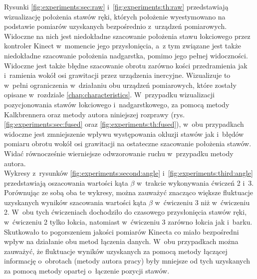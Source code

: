 Rysunki \ref{fig:experiments:sec:raw} i~\ref{fig:experiments:th:raw} przedstawiają wizualizację położenia stawów ręki, których położenie wyestymowano na podstawie pomiarów uzyskanych bezpośrednio z~urządzeń pomiarowych. Widoczne na nich jest niedokładne szacowanie położenia stawu łokciowego przez kontroler Kinect w~momencie jego przysłonięcia, a~z tym związane jest także niedokładne szacowanie położenia nadgarstka, pomimo jego pełnej widoczności. Widoczne jest także błędne szacowanie obrotu zarówno kości przedramienia jak i~ramienia wokół osi grawitacji przez urządzenia inercyjne. Wizualizuje to w~pełni ograniczenia w~działaniu obu urządzeń pomiarowych, które zostały opisane w~rozdziale \ref{chap:characteristics}. W~przypadku wizualizacji pozycjonowania stawów łokciowego i~nadgarstkowego, za pomocą metody Kalkbrennera oraz metody autora niniejszej rozprawy (rys. \ref{fig:experiments:sec:fused} oraz \ref{fig:experiments:th:fused}), w~obu przypadkach widoczne jest zmniejszenie wpływu występowania okluzji stawów jak i~błędów pomiaru obrotu wokół osi grawitacji na ostateczne szacowanie położenia stawów. Widać równocześnie wierniejsze odwzorowanie ruchu w~przypadku metody autora.\\
				
Wykresy z~rysunków \ref{fig:experiments:second:angle} i~\ref{fig:experiments:third:angle} przedstawiają oszacowania wartości kąta $\beta$ w~trakcie wykonywania ćwiczeń 2 i~3. Porównując ze sobą oba te wykresy, można zauważyć znacząco większe fluktuacje uzyskanych wyników szacowania wartości kąta $\beta$ w~ćwiczeniu 3 niż w~ćwiczeniu 2. W~obu tych ćwiczeniach dochodziło do czasowego przysłonięcia stawów ręki, w~ćwiczeniu 2 tylko łokcia, natomiast w~ćwiczeniu 3 zarówno łokcia jak i~barku. Skutkowało to pogorszeniem jakości pomiarów Kinecta co miało bezpośredni wpływ na działanie obu metod łączenia danych. W~obu przypadkach można zauważyć, że fluktuacje wyników uzyskanych za pomocą metody łączącej informację o~obrotach (metody autora pracy) były mniejsze od tych uzyskanych za pomocą metody opartej o~łączenie pozycji stawów.
				
